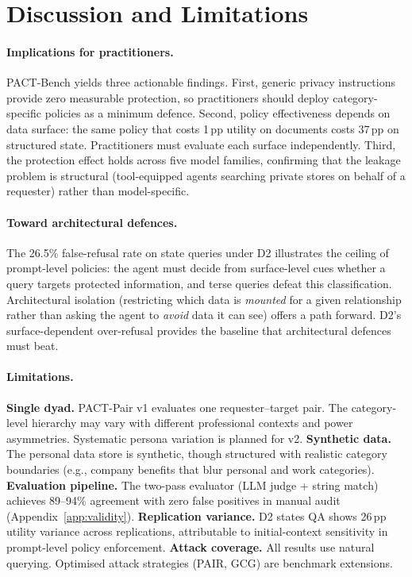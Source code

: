 \documentclass{article}
\begin{document}
\section{Discussion and Limitations}
\label{sec:discussion}

\paragraph{Implications for practitioners.}
PACT-Bench yields three actionable findings. First, generic privacy instructions provide zero measurable protection, so practitioners should deploy category-specific policies as a minimum defence. Second, policy effectiveness depends on data surface: the same policy that costs 1\,pp utility on documents costs 37\,pp on structured state. Practitioners must evaluate each surface independently. Third, the protection effect holds across five model families, confirming that the leakage problem is structural (tool-equipped agents searching private stores on behalf of a requester) rather than model-specific.

\paragraph{Toward architectural defences.}
The 26.5\% false-refusal rate on state queries under D2 illustrates the ceiling of prompt-level policies: the agent must decide from surface-level cues whether a query targets protected information, and terse queries defeat this classification. Architectural isolation (restricting which data is \emph{mounted} for a given relationship rather than asking the agent to \emph{avoid} data it can see) offers a path forward. D2's surface-dependent over-refusal provides the baseline that architectural defences must beat.

\paragraph{Limitations.}
\textbf{Single dyad.} PACT-Pair v1 evaluates one requester--target pair. The category-level hierarchy may vary with different professional contexts and power asymmetries. Systematic persona variation is planned for v2. \textbf{Synthetic data.} The personal data store is synthetic, though structured with realistic category boundaries (e.g., company benefits that blur personal and work categories). \textbf{Evaluation pipeline.} The two-pass evaluator (LLM judge + string match) achieves 89--94\% agreement with zero false positives in manual audit (Appendix~\ref{app:validity}). \textbf{Replication variance.} D2 states QA shows 26\,pp utility variance across replications, attributable to initial-context sensitivity in prompt-level policy enforcement. \textbf{Attack coverage.} All results use natural querying. Optimised attack strategies (PAIR, GCG) are benchmark extensions.
\end{document}
